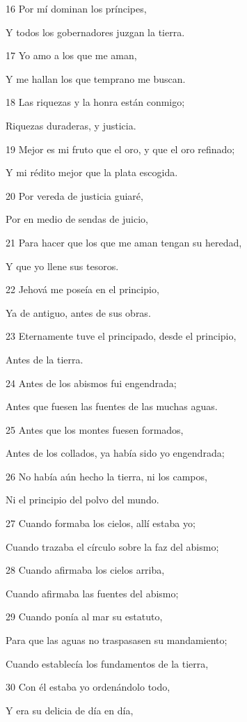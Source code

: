 \par 16 Por mí dominan los príncipes,
\par Y todos los gobernadores juzgan la tierra.
\par 17 Yo amo a los que me aman,
\par Y me hallan los que temprano me buscan.
\par 18 Las riquezas y la honra están conmigo;
\par Riquezas duraderas, y justicia.
\par 19 Mejor es mi fruto que el oro, y que el oro refinado;
\par Y mi rédito mejor que la plata escogida.
\par 20 Por vereda de justicia guiaré,
\par Por en medio de sendas de juicio,
\par 21 Para hacer que los que me aman tengan su heredad,
\par Y que yo llene sus tesoros.
\par 22 Jehová me poseía en el principio,
\par Ya de antiguo, antes de sus obras. 
\par 23 Eternamente tuve el principado, desde el principio,
\par Antes de la tierra.
\par 24 Antes de los abismos fui engendrada;
\par Antes que fuesen las fuentes de las muchas aguas.
\par 25 Antes que los montes fuesen formados,
\par Antes de los collados, ya había sido yo engendrada;
\par 26 No había aún hecho la tierra, ni los campos,
\par Ni el principio del polvo del mundo.
\par 27 Cuando formaba los cielos, allí estaba yo;
\par Cuando trazaba el círculo sobre la faz del abismo;
\par 28 Cuando afirmaba los cielos arriba,
\par Cuando afirmaba las fuentes del abismo;
\par 29 Cuando ponía al mar su estatuto,
\par Para que las aguas no traspasasen su mandamiento;
\par Cuando establecía los fundamentos de la tierra,
\par 30 Con él estaba yo ordenándolo todo,
\par Y era su delicia de día en día,
